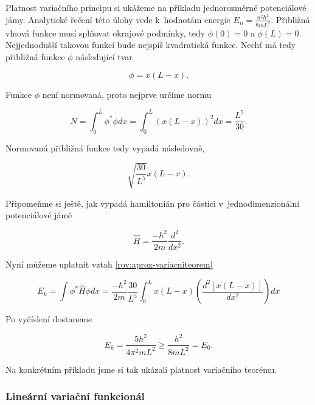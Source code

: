 \begin{priklad}
Platnost variačního principu si ukážeme na příkladu jednorozměrné potenciálové jámy. Analytické řečení této úlohy vede k~hodnotám energie $ E_n=\frac{n^2h^2}{8mL^2}$. Přibližná vlnová funkce musí splňovat okrajové podmínky, tedy $ \phi(0)=0 $ a $ \phi(L)=0 $. Nejjednodušší takovou funkcí bude nejspíš kvadratická funkce. Nechť má tedy přibližná funkce $\phi$ následující tvar
 
\begin{displaymath} 
\phi=x(L-x).
\end{displaymath}
 
Funkce $\phi$ není normovaná, proto nejprve určíme normu
 
\begin{displaymath} 
N=\int_0^L \phi^*\phi dx=\int_0^L (x(L-x))^2 dx=\frac{L^5}{30}.
\end{displaymath}
 
\noindent Normovaná přibližná funkce tedy vypadá následovně,
 
\begin{displaymath} 
\sqrt{\frac{30}{L^5}} x(L-x).
\end{displaymath}
 
Připomeňme si ještě, jak vypadá hamiltonián pro částici v~jednodimenzionální potenciálové jámě
 
\begin{displaymath} 
\hat{H}=\frac{-\hbar^2}{2m}\frac{d^2}{d x^2}.
\end{displaymath}
 
Nyní můžeme uplatnit vztah \ref{rov:aprox-variacniteorem}

   \begin{displaymath} 
E_k=\int\phi^*\hat{H}\phi dx=\frac{-\hbar^2}{2m}\frac{30}{L^5}\int_0^L x(L-x)\left(\frac{d^2 [x(L-x)]}{d x^2}\right)dx
\end{displaymath}
 
 Po vyčíslení dostaneme
 
    \begin{displaymath} 
E_k=\frac{5h^2}{4\pi^2 mL^2}\geq \frac{h^2}{8mL^2}=E_0.    
\end{displaymath}
 
Na konkrétním příkladu jsme si tak ukázali platnost variačního teorému. 
\end{priklad}
 
\subsubsection{Lineární variační funkcionál}
\label{kap:Lin Var funkcional}
 
